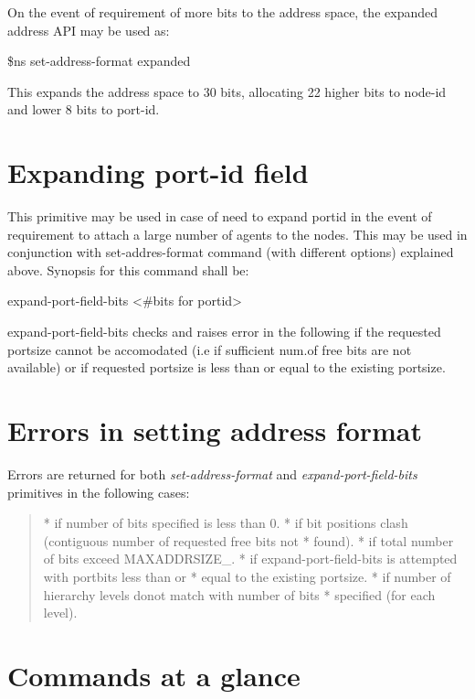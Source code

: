 On the event of requirement of more bits to the address space, the
expanded address API may be used as:

\$ns set-address-format expanded   

This expands the address space to 30 bits, allocating 22 higher bits to
node-id and lower 8 bits to port-id. 


\section{Expanding port-id field}    
\label{sec:expandportFormat}

This primitive may be used in case of need to expand portid in the event
of requirement to attach a large number of agents to the nodes. This may
be used in conjunction with set-addres-format command (with different
options) explained above. Synopsis for this command shall be:

expand-port-field-bits <\#bits for portid> 

expand-port-field-bits checks and raises error in the following if the
requested portsize cannot be accomodated (i.e if sufficient num.of free
bits are not available) or if requested portsize is less than or equal
to the existing portsize. 

\section{Errors in setting address format}
\label{sec:err-add}

Errors are returned for both {\em set-address-format} and
{\em expand-port-field-bits} primitives in the following cases:
\begin{quote}
* if number of bits specified is less than 0.
* if bit positions clash (contiguous number of requested free bits not
* found).  
* if total number of bits exceed MAXADDRSIZE\_.
* if expand-port-field-bits is attempted with portbits less than or
* equal to the existing portsize.
* if number of hierarchy levels donot match with number of bits
* specified (for each level).  
\end{quote}

\section{Commands at a glance}
\label{sec:addresscommand}


